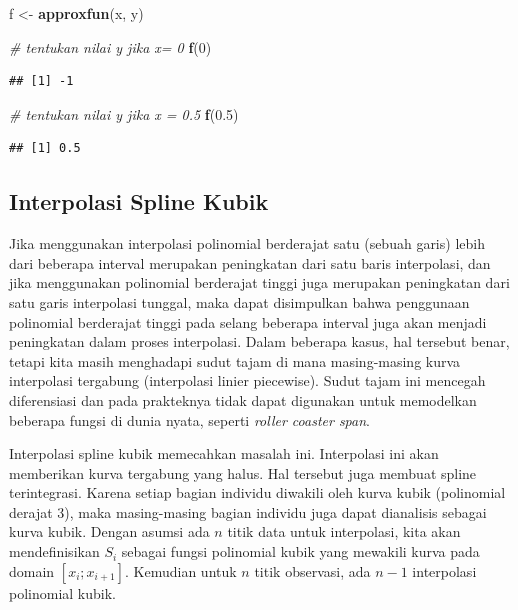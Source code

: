 \documentclass[]{book}
\newenvironment{Shaded}{\begin{snugshade}}{\end{snugshade}}
\newcommand{\CommentTok}[1]{\textcolor[rgb]{0.56,0.35,0.01}{\textit{#1}}}
\newcommand{\DecValTok}[1]{\textcolor[rgb]{0.00,0.00,0.81}{#1}}
\newcommand{\FloatTok}[1]{\textcolor[rgb]{0.00,0.00,0.81}{#1}}
\newcommand{\KeywordTok}[1]{\textcolor[rgb]{0.13,0.29,0.53}{\textbf{#1}}}
\newcommand{\NormalTok}[1]{#1}
\newcommand{\StringTok}[1]{\textcolor[rgb]{0.31,0.60,0.02}{#1}}
\theoremstyle{definition}
\theoremstyle{definition}
\theoremstyle{definition}
\theoremstyle{remark}
\begin{document}
\begin{Shaded}
\begin{Highlighting}[]
\NormalTok{f <-}\StringTok{ }\KeywordTok{approxfun}\NormalTok{(x, y)}

\CommentTok{# tentukan nilai y jika x= 0}
\KeywordTok{f}\NormalTok{(}\DecValTok{0}\NormalTok{)}
\end{Highlighting}
\end{Shaded}

\begin{verbatim}
## [1] -1
\end{verbatim}

\begin{Shaded}
\begin{Highlighting}[]
\CommentTok{# tentukan nilai y jika x = 0.5}
\KeywordTok{f}\NormalTok{(}\FloatTok{0.5}\NormalTok{)}
\end{Highlighting}
\end{Shaded}

\begin{verbatim}
## [1] 0.5
\end{verbatim}

\hypertarget{cubicspline}{%
\subsection{Interpolasi Spline Kubik}\label{cubicspline}}

Jika menggunakan interpolasi polinomial berderajat satu (sebuah garis) lebih dari beberapa interval merupakan peningkatan dari satu baris interpolasi, dan jika menggunakan polinomial berderajat tinggi juga merupakan peningkatan dari satu garis interpolasi tunggal, maka dapat disimpulkan bahwa penggunaan polinomial berderajat tinggi pada selang beberapa interval juga akan menjadi peningkatan dalam proses interpolasi. Dalam beberapa kasus, hal tersebut benar, tetapi kita masih menghadapi sudut tajam di mana masing-masing kurva interpolasi tergabung (interpolasi linier piecewise). Sudut tajam ini mencegah diferensiasi dan pada prakteknya tidak dapat digunakan untuk memodelkan beberapa fungsi di dunia nyata, seperti \emph{roller coaster span}.

Interpolasi spline kubik memecahkan masalah ini. Interpolasi ini akan memberikan kurva tergabung yang halus. Hal tersebut juga membuat spline terintegrasi. Karena setiap bagian individu diwakili oleh kurva kubik (polinomial derajat 3), maka masing-masing bagian individu juga dapat dianalisis sebagai kurva kubik. Dengan asumsi ada \(n\) titik data untuk interpolasi, kita akan mendefinisikan \(S_i\) sebagai fungsi polinomial kubik yang mewakili kurva pada domain \(\left[x_i; x_{i + 1}\right]\). Kemudian untuk \(n\) titik observasi, ada \(n - 1\) interpolasi polinomial kubik.
\end{document}
